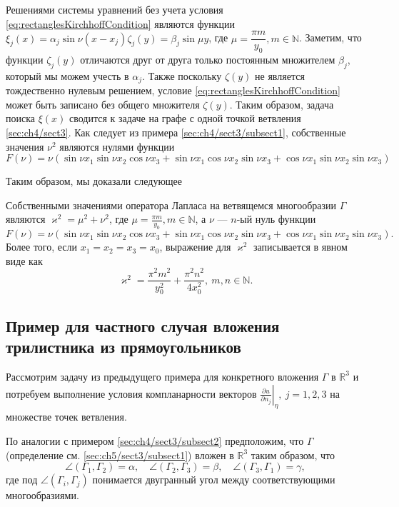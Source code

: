 Решениями системы уравнений без учета условия \eqref{eq:rectanglesKirchhoffCondition} являются функции $\xi_j(x) = \alpha_j \sin \nu (x-x_j) \zeta_j(y) = \beta_j \sin \mu y$, где $\mu = \dfrac{\pi m}{y_0}, m \in \mathbb{N}$. 
Заметим, что функции $\zeta_j(y)$ отличаются друг от друга только постоянным множителем $\beta_j$, который мы можем учесть в $\alpha_j$. 
Также поскольку $\zeta(y)$ не является тождественно нулевым решением, условие \eqref{eq:rectanglesKirchhoffCondition} может быть записано без общего множителя $\zeta(y)$. 
Таким образом, задача поиска $\xi(x)$ сводится к задаче на графе с одной точкой ветвления \eqref{sec:ch4/sect3}. Как следует из примера \eqref{sec:ch4/sect3/subsect1}, собственные значения $\nu^2$ являются нулями функции $F(\nu) = \nu \left( \sin{\nu x_1} \sin{\nu x_2} \cos{\nu x_3} +  \sin{\nu x_1} \cos{\nu x_2} \sin{\nu x_3} +  \cos{\nu x_1} \sin{\nu x_2} \sin{\nu x_3} \right)$

Таким образом, мы доказали следующее
\begin{statement}
Собственными значениями оператора Лапласа на ветвящемся многообразии $\Gamma$ являются $\varkappa^2 = \mu^2 + \nu^2$, где $\mu = \frac{\pi m}{y_0}, m \in \mathbb{N}$, а $\nu$ --- $n$-ый нуль функции 
\begin{equation*}
F(\nu) = \nu \left( \sin{\nu x_1} \sin{\nu x_2} \cos{\nu x_3} + \sin{\nu x_1} \cos{\nu x_2} \sin{\nu x_3} +  \cos{\nu x_1} \sin{\nu x_2} \sin{\nu x_3} \right).
\end{equation*}
Более того, если $x_1=x_2=x_3=x_0$, выражение для $\varkappa^2$ записывается в явном виде как
$$\varkappa^2 = \frac{\pi^2 m^2}{y_0^2} + \frac{\pi^2 n^2}{4x_0^2}, \  m, n \in \mathbb{N}.$$
\end{statement}

\subsection{Пример для частного случая вложения трилистника из прямоугольников}\label{sec:ch5/sect3/subsect2}
Рассмотрим задачу из предыдущего примера для конкретного вложения  $\Gamma$ в $\mathbb{R}^3$ и потребуем выполнение условия компланарности векторов $\left. \frac{\partial u}{\partial n_j} \right|_\eta, \ j = 1,2,3$ на множестве точек ветвления.

По аналогии с примером \eqref{sec:ch4/sect3/subsect2} предположим, что  $\Gamma$ (определение см. \eqref{sec:ch5/sect3/subsect1}) вложен в $\mathbb{R}^3$ таким образом, что 
$$
\angle( \Gamma_1, \Gamma_2) = \alpha, \quad
\angle( \Gamma_2, \Gamma_3) = \beta, \quad
\angle( \Gamma_3, \Gamma_1) = \gamma,
$$
где под $\angle( \Gamma_i, \Gamma_j)$ понимается двугранный угол между соответствующими многообразиями.

